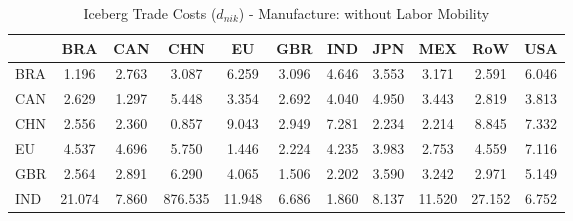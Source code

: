 \begin{table}[htbp]
\centering
\caption{Iceberg Trade Costs ($d_{nik}$) - Manufacture: without Labor Mobility} 
\label{tab:iceberg_Manufacture}
\begin{tabular}{lcccccccccc}
  \hline
 & BRA & CAN & CHN & EU & GBR & IND & JPN & MEX & RoW & USA \\ 
  \hline
BRA & \textcolor[RGB]{247,160,8}{1.196} & \textcolor[RGB]{156,101,99}{2.763} & \textcolor[RGB]{128,82,128}{3.087} & \textcolor[RGB]{41,26,214}{6.259} & \textcolor[RGB]{125,81,130}{3.096} & \textcolor[RGB]{61,40,194}{4.646} & \textcolor[RGB]{102,66,153}{3.553} & \textcolor[RGB]{122,79,133}{3.171} & \textcolor[RGB]{178,115,76}{2.591} & \textcolor[RGB]{43,28,212}{6.046} \\ 
  CAN & \textcolor[RGB]{173,112,82}{2.629} & \textcolor[RGB]{245,158,10}{1.297} & \textcolor[RGB]{48,31,207}{5.448} & \textcolor[RGB]{112,73,143}{3.354} & \textcolor[RGB]{166,107,89}{2.692} & \textcolor[RGB]{79,51,176}{4.040} & \textcolor[RGB]{54,35,201}{4.950} & \textcolor[RGB]{110,71,145}{3.443} & \textcolor[RGB]{153,99,102}{2.819} & \textcolor[RGB]{87,56,168}{3.813} \\ 
  CHN & \textcolor[RGB]{184,119,71}{2.556} & \textcolor[RGB]{196,127,59}{2.360} & \textcolor[RGB]{252,163,3}{0.857} & \textcolor[RGB]{13,8,242}{9.043} & \textcolor[RGB]{140,91,115}{2.949} & \textcolor[RGB]{25,16,230}{7.281} & \textcolor[RGB]{204,132,51}{2.234} & \textcolor[RGB]{209,135,46}{2.214} & \textcolor[RGB]{15,10,240}{8.845} & \textcolor[RGB]{23,15,232}{7.332} \\ 
  EU & \textcolor[RGB]{66,43,189}{4.537} & \textcolor[RGB]{59,38,196}{4.696} & \textcolor[RGB]{46,30,209}{5.750} & \textcolor[RGB]{235,152,20}{1.446} & \textcolor[RGB]{207,134,48}{2.224} & \textcolor[RGB]{74,48,181}{4.235} & \textcolor[RGB]{82,53,173}{3.983} & \textcolor[RGB]{158,102,97}{2.753} & \textcolor[RGB]{64,41,191}{4.559} & \textcolor[RGB]{28,18,227}{7.116} \\ 
  GBR & \textcolor[RGB]{181,117,74}{2.564} & \textcolor[RGB]{148,96,107}{2.891} & \textcolor[RGB]{38,25,217}{6.290} & \textcolor[RGB]{77,50,178}{4.065} & \textcolor[RGB]{232,150,23}{1.506} & \textcolor[RGB]{212,137,43}{2.202} & \textcolor[RGB]{99,64,156}{3.590} & \textcolor[RGB]{117,76,138}{3.242} & \textcolor[RGB]{133,86,122}{2.971} & \textcolor[RGB]{51,33,204}{5.149} \\ 
  IND & \textcolor[RGB]{5,3,250}{21.074} & \textcolor[RGB]{20,13,235}{7.860} & \textcolor[RGB]{0,0,255}{876.535} & \textcolor[RGB]{8,5,247}{11.948} & \textcolor[RGB]{33,21,222}{6.686} & \textcolor[RGB]{222,144,33}{1.860} & \textcolor[RGB]{18,12,237}{8.137} & \textcolor[RGB]{10,7,245}{11.520} & \textcolor[RGB]{3,2,252}{27.152} & \textcolor[RGB]{31,20,224}{6.752} \\ 

\end{tabular}
\end{table}
